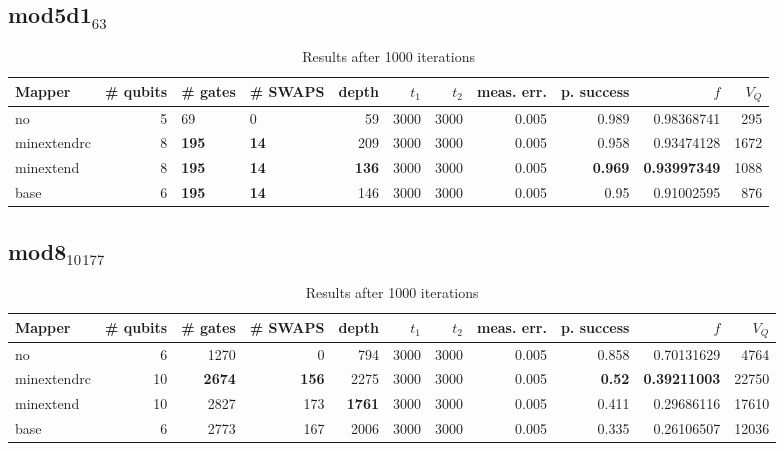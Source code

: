 \documentclass[11pt]{article}
\begin{document}
\subsection{mod5d1\(_{\text{63}}\)}
\label{sec:orgbad0784}
\begin{table}[H]
\caption{\label{tab:org832ceee}
Results after 1000 iterations}
\centering
\small
\begin{tabular}{lrllrrrrrrr}
\hline
Mapper & \# qubits & \# gates & \# SWAPS & depth & \(t_1\) & \(t_2\) & meas. err. & p. success & \(f\) & \(V_Q\)\\
\hline
no & 5 & 69 & 0 & 59 & 3000 & 3000 & 0.005 & 0.989 & 0.98368741 & 295\\
\hline
minextendrc & 8 & \textbf{195} & \textbf{14} & 209 & 3000 & 3000 & 0.005 & 0.958 & 0.93474128 & 1672\\
minextend & 8 & \textbf{195} & \textbf{14} & \textbf{136} & 3000 & 3000 & 0.005 & \textbf{0.969} & \textbf{0.93997349} & 1088\\
base & 6 & \textbf{195} & \textbf{14} & 146 & 3000 & 3000 & 0.005 & 0.95 & 0.91002595 & 876\\
\hline
\end{tabular}
\end{table}
\subsection{mod8\(_{\text{10}}\)\(_{\text{177}}\)}
\label{sec:orga19b903}
\begin{table}[H]
\caption{\label{tab:org7a1b4c6}
Results after 1000 iterations}
\centering
\small
\begin{tabular}{lrrrrrrrrrr}
\hline
Mapper & \# qubits & \# gates & \# SWAPS & depth & \(t_1\) & \(t_2\) & meas. err. & p. success & \(f\) & \(V_Q\)\\
\hline
no & 6 & 1270 & 0 & 794 & 3000 & 3000 & 0.005 & 0.858 & 0.70131629 & 4764\\
\hline
minextendrc & 10 & \textbf{2674} & \textbf{156} & 2275 & 3000 & 3000 & 0.005 & \textbf{0.52} & \textbf{0.39211003} & 22750\\
minextend & 10 & 2827 & 173 & \textbf{1761} & 3000 & 3000 & 0.005 & 0.411 & 0.29686116 & 17610\\
base & 6 & 2773 & 167 & 2006 & 3000 & 3000 & 0.005 & 0.335 & 0.26106507 & 12036\\
\hline
\end{tabular}
\end{table}
\end{document}
